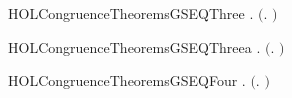 \newcommand{\HOLCongruenceTheoremsGSEQTwo}{\UseVerbatim{HOLCongruenceTheoremsGSEQTwo}}
\begin{SaveVerbatim}{HOLCongruenceTheoremsGSEQThree}
\HOLTokenTurnstile{} \HOLSymConst{\HOLTokenForall{}} .   \HOLSymConst{\HOLTokenImp{}}  \ensuremath{(}\HOLTokenLambda{}. \HOLSymConst{\ensuremath{\ldotp}} \ensuremath{)}
\end{SaveVerbatim}
\newcommand{\HOLCongruenceTheoremsGSEQThree}{\UseVerbatim{HOLCongruenceTheoremsGSEQThree}}
\begin{SaveVerbatim}{HOLCongruenceTheoremsGSEQThreea}
\HOLTokenTurnstile{} \HOLSymConst{\HOLTokenForall{}}.  \ensuremath{(}\HOLTokenLambda{}. \HOLSymConst{\ensuremath{\ldotp}}\ensuremath{)}
\end{SaveVerbatim}
\newcommand{\HOLCongruenceTheoremsGSEQThreea}{\UseVerbatim{HOLCongruenceTheoremsGSEQThreea}}
\begin{SaveVerbatim}{HOLCongruenceTheoremsGSEQFour}
\HOLTokenTurnstile{} \HOLSymConst{\HOLTokenForall{}}   .
         \HOLSymConst{\HOLTokenConj{}}   \HOLSymConst{\HOLTokenImp{}}  \ensuremath{(}\HOLTokenLambda{}. \HOLSymConst{\ensuremath{\ldotp}}  \HOLSymConst{\ensuremath{+}} \HOLSymConst{\ensuremath{\ldotp}} \ensuremath{)}
\end{SaveVerbatim}
\newcommand{\HOLCongruenceTheoremsGSEQFour}{\UseVerbatim{HOLCongruenceTheoremsGSEQFour}}
